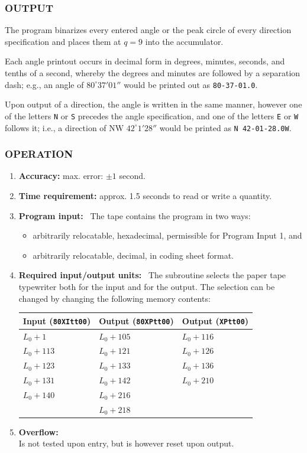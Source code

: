 \subsubsection*{OUTPUT}
The program binarizes every entered angle or the peak circle of every direction specification and places them at $q = 9$ into the accumulator.

Each angle printout occurs in decimal form in degrees, minutes, seconds, and tenths of a second, whereby the degrees and minutes are followed by a separation dash; e.g., an angle of $80^\circ 37' 01''$ would be printed out as \texttt{80-37-01.0}.

Upon output of a direction, the angle is written in the same manner, however one of the letters \texttt{N} or \texttt{S} precedes the angle specification, and one of the letters \texttt{E} or \texttt{W} follows it; i.e., a direction of $\text{NW } 42^\circ 1' 28''$ would be printed as \texttt{N 42-01-28.0W}.

\subsubsection*{OPERATION}
\begin{enumerate}
\item \textbf{Accuracy:} max. error: $\pm 1$ second.
\item \textbf{Time requirement:} approx. 1.5 seconds to read or write a quantity.
\item \textbf{Program input:} \
The tape contains the program in two ways:
\begin{itemize}
\item[a)] arbitrarily relocatable, hexadecimal, permissible for Program Input 1, and
\item[b)] arbitrarily relocatable, decimal, in coding sheet format.
\end{itemize}
\item \textbf{Required input/output units:} \
The subroutine selects the paper tape typewriter both for the input and for the output. The selection can be changed by changing the following memory contents:
\begin{table}[h!]
\centering
\begin{tabular}{lll}
\toprule
\textbf{Input (\texttt{80XItt00})} & \textbf{Output (\texttt{80XPtt00})} & \textbf{Output (\texttt{XPtt00})} \\
\midrule
$L_0 + 1$   & $L_0 + 105$ & $L_0 + 116$ \\
$L_0 + 113$ & $L_0 + 121$ & $L_0 + 126$ \\
$L_0 + 123$ & $L_0 + 133$ & $L_0 + 136$ \\
$L_0 + 131$ & $L_0 + 142$ & $L_0 + 210$ \\
$L_0 + 140$ & $L_0 + 216$ &             \\
& $L_0 + 218$ &             \\
\bottomrule
\end{tabular}
\end{table}
\item \textbf{Overflow:} \\
Is not tested upon entry, but is however reset upon output.
\end{enumerate}

